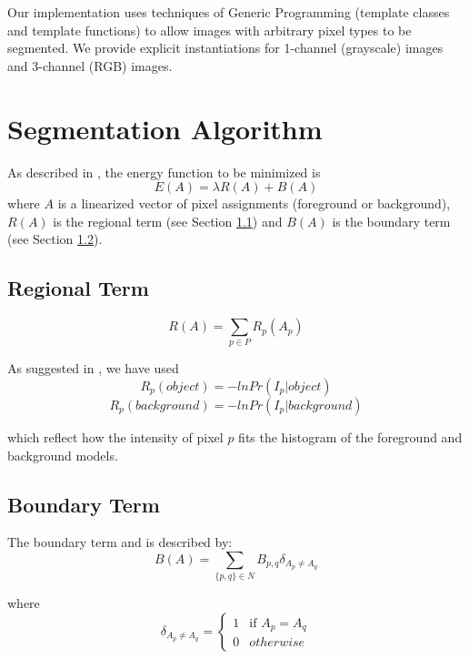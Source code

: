 \documentclass{InsightArticle}
\begin{document}
Our implementation uses techniques of Generic Programming (template classes and template functions) to allow images with arbitrary pixel types to be segmented. We provide explicit instantiations for 1-channel (grayscale) images and 3-channel (RGB) images.

\section{Segmentation Algorithm}
\label{sec:Algorithm}
As described in \cite{boykov2006}, the energy function to be minimized is
\begin{equation}
 E(A) = \lambda R(A) + B(A)
\end{equation}
where $A$ is a linearized vector of pixel assignments (foreground or background), $R(A)$ is the regional term (see Section \ref{subsec:RegionalTerm}) and $B(A)$ is the boundary term (see Section \ref{subsec:BoundaryTerm}).

\subsection{Regional Term}
\label{subsec:RegionalTerm}
\begin{equation}
 R(A) = \sum_{p \in P} R_p(A_p)
\end{equation}

As suggested in \cite{boykov2006}, we have used
\begin{equation}
 R_p(object) = -ln Pr(I_p|object)
\end{equation}
\begin{equation}
 R_p(background) = -ln Pr(I_p|background)
\end{equation}

which reflect how the intensity of pixel $p$ fits the histogram of the foreground and background models.

\subsection{Boundary Term}
\label{subsec:BoundaryTerm}
The boundary term and is described by:
\begin{equation}
 B(A) = \sum_{ \{p,q\} \in N} B_{p,q} \delta_{A_p\neq A_q}
\end{equation}

where 
\begin{equation*}
\delta_{A_p\neq A_q} =
\begin{cases} 
1 & \text{if } A_p = A_q
\\
0 & otherwise
\end{cases}
\end{equation*}
\end{document}
